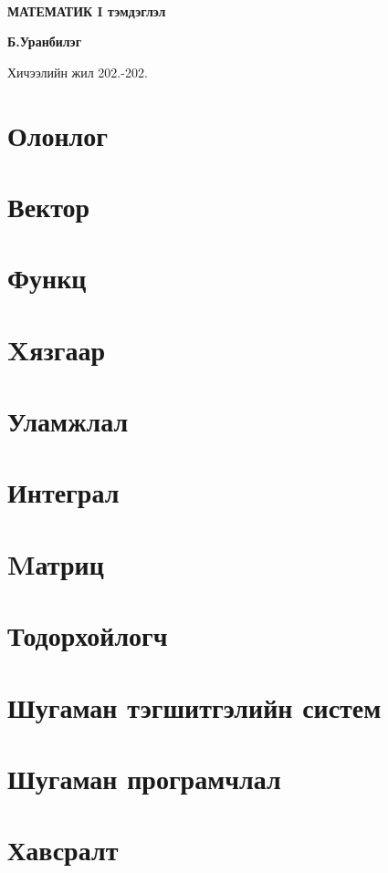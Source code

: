 \documentclass[11pt,twoside,openright]{report}
\begin{document}
\begin{titlepage}
	\centering
	
	\par\
	\vspace{0.5 cm}
	
	\vspace{5.5cm}
	{\huge\bfseries  МАТЕМАТИК I тэмдэглэл \par}
	\vspace{1cm}
	\raggedleft
	{\Large\bfseries  
	 Б.Уранбилэг\par}
	\vspace{1cm}
	\raggedleft
	\par
	\raggedleft 
	\vfill
\centering
	{\large Хичээлийн жил 202.-202. \par}
	\tableofcontents
\end{titlepage}
\chapter{Олонлог}

\chapter{Вектор}

\chapter{Функц}

\chapter{Xязгаар}

\chapter{Уламжлал}

\chapter{Интеграл}

\chapter{Mатриц}

\chapter{Тодорхойлогч}

\chapter{Шугаман тэгшитгэлийн систем}

\chapter{Шугаман програмчлал}


\chapter{Хавсралт}



\end{document}
